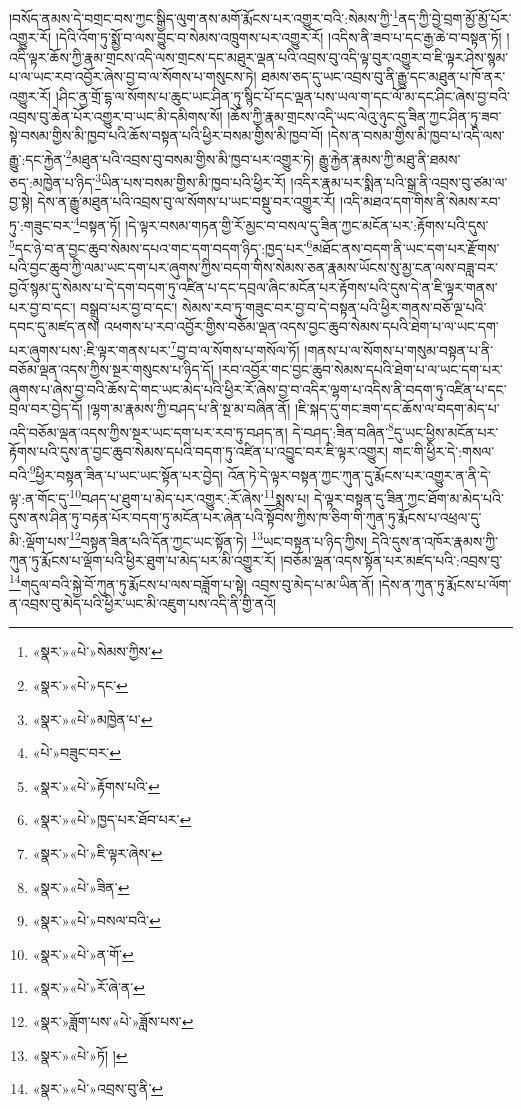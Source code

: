 །བསོད་ནམས་དེ་བགྲང་བས་ཀྱང་སྒྱིད་ལུག་ནས་མགོ་རྨོངས་པར་འགྱུར་བའི་:སེམས་ཀྱི་\footnote{«སྣར་»«པེ་»སེམས་ཀྱིས་}ནད་ཀྱི་བྱེ་བྲག་མྱོ་མྱོ་པོར་འགྱུར་རོ། །དེའི་འོག་ཏུ་སྨྱོ་བ་ལས་བྱུང་བ་སེམས་འཁྲུགས་པར་འགྱུར་རོ། །འདིས་ནི་ཟབ་པ་དང་རྒྱ་ཆེ་བ་བསྟན་ཏོ། །
འདི་ལྟར་ཆོས་ཀྱི་རྣམ་གྲངས་འདི་ལས་གྲངས་དང་མཐུར་ལྡན་པའི་འབྲས་བུ་འདི་ལྟ་བུར་འགྱུར་བ་ཇི་ལྟར་ཤེས་སྙམ་པ་ལ་ཡང་རབ་འབྱོར་ཞེས་བྱ་བ་ལ་སོགས་པ་གསུངས་ཏེ། ཐམས་ཅད་དུ་ཡང་འབྲས་བུ་ནི་རྒྱུ་དང་མཐུན་པ་ཁོ་ནར་འགྱུར་རོ། །ཤིང་ནྱ་གྲོ་དྷ་ལ་སོགས་པ་ཆུང་ཡང་ཤིན་ཏུ་སྙིང་པོ་དང་ལྡན་པས་ཡལ་ག་དང་ལོ་མ་དང་ཤིང་ཞེས་བྱ་བའི་འབྲས་བུ་ཆེན་པོར་འགྱུར་བ་ཡང་མི་དམིགས་སོ། །ཆོས་ཀྱི་རྣམ་གྲངས་འདི་ཡང་ལེའུ་ཉུང་དུ་ཟིན་ཀྱང་ཤིན་ཏུ་ཟབ་སྟེ་བསམ་གྱིས་མི་ཁྱབ་པའི་ཆོས་བསྟན་པའི་ཕྱིར་བསམ་གྱིས་མི་ཁྱབ་བོ། །དེས་ན་བསམ་གྱིས་མི་ཁྱབ་པ་འདི་ལས་རྒྱུ་:དང་རྐྱེན་\footnote{«སྣར་»«པེ་»དང་}མཐུན་པའི་འབྲས་བུ་བསམ་གྱིས་མི་ཁྱབ་པར་འགྱུར་ཏེ། རྒྱུ་རྐྱེན་རྣམས་ཀྱི་མཐུ་ནི་ཐམས་ཅད་:མཁྱེན་པ་ཉིད་\footnote{«སྣར་»«པེ་»མཁྱེན་པ་}ཡིན་པས་བསམ་གྱིས་མི་ཁྱབ་པའི་ཕྱིར་རོ། །འདིར་རྣམ་པར་སྨིན་པའི་སྒྲ་ནི་འབྲས་བུ་ཙམ་ལ་བྱ་སྟེ། དེས་ན་རྒྱུ་མཐུན་པའི་འབྲས་བུ་ལ་སོགས་པ་ཡང་བསྡུ་བར་འགྱུར་རོ། །འདི་མཐའ་དག་གིས་ནི་སེམས་རབ་ཏུ་:གཟུང་བར་\footnote{«པེ་»བཟུང་བར་}བསྟན་ཏོ། །དེ་ལྟར་བསམ་གཏན་གྱི་རོ་མྱང་བ་བསལ་དུ་ཟིན་ཀྱང་མངོན་པར་:རྟོགས་པའི་དུས་\footnote{«སྣར་»«པེ་»རྟོགས་པའི་}དང་ཉེ་བ་ན་བྱང་ཆུབ་སེམས་དཔའ་གང་དག་བདག་ཉིད་:ཁྱད་པར་\footnote{«སྣར་»«པེ་»ཁྱད་པར་ཐོབ་པར་}མཐོང་ནས་བདག་ནི་ཡང་དག་པར་རྫོགས་པའི་བྱང་ཆུབ་ཀྱི་ལམ་ཡང་དག་པར་ཞུགས་ཀྱིས་བདག་གིས་སེམས་ཅན་རྣམས་ཡོངས་སུ་མྱ་ངན་ལས་བཟླ་བར་བྱའོ་སྙམ་དུ་སེམས་པ་དེ་དག་བདག་ཏུ་འཛིན་པ་དང་དབྲལ་ཞིང་མངོན་པར་རྟོགས་པའི་དུས་དེ་ན་ཇི་ལྟར་གནས་པར་བྱ་བ་དང་། བསྒྲུབ་པར་བྱ་བ་དང་། སེམས་རབ་ཏུ་གཟུང་བར་བྱ་བ་དེ་བསྟན་པའི་ཕྱིར་གནས་བཅོ་ལྔ་པའི་དབང་དུ་མཛད་ནས། འཕགས་པ་རབ་འབྱོར་གྱིས་བཅོམ་ལྡན་འདས་བྱང་ཆུབ་སེམས་དཔའི་ཐེག་པ་ལ་ཡང་དག་པར་ཞུགས་པས་:ཇི་ལྟར་གནས་པར་\footnote{«སྣར་»«པེ་»ཇི་ལྟར་ཞེས་}བྱ་བ་ལ་སོགས་པ་གསོལ་ཏོ། །གནས་པ་ལ་སོགས་པ་གསུམ་བསྟན་པ་ནི་བཅོམ་ལྡན་འདས་ཀྱིས་སྔར་གསུངས་པ་ཉིད་དོ། །རབ་འབྱོར་གང་བྱང་ཆུབ་སེམས་དཔའི་ཐེག་པ་ལ་ཡང་དག་པར་ཞུགས་པ་ཞེས་བྱ་བའི་ཆོས་དེ་གང་ཡང་མེད་པའི་ཕྱིར་རོ་ཞེས་བྱ་བ་འདིར་ལྷག་པ་འདིས་ནི་བདག་ཏུ་འཛིན་པ་དང་བྲལ་བར་བྱེད་དོ། །ལྷག་མ་རྣམས་ཀྱི་བཤད་པ་ནི་སྔ་མ་བཞིན་ནོ། །ཇི་སྐད་དུ་གང་ཟག་དང་ཆོས་ལ་བདག་མེད་པ་འདི་བཅོམ་ལྡན་འདས་ཀྱིས་སྔར་ཡང་དག་པར་རབ་ཏུ་བཤད་ན། དེ་བཤད་:ཟིན་བཞིན་\footnote{«སྣར་»«པེ་»ཟིན་}དུ་ཡང་ཕྱིས་མངོན་པར་རྟོགས་པའི་དུས་ན་བྱང་ཆུབ་སེམས་དཔའི་བདག་ཏུ་འཛིན་པ་འབྱུང་བར་ཇི་ལྟར་འགྱུར། གང་གི་ཕྱིར་དེ་:གསལ་བའི་\footnote{«སྣར་»«པེ་»བསལ་བའི་}ཕྱིར་བསྟན་ཟིན་པ་ཡང་ཡང་སྟོན་པར་བྱེད། འོན་ཏེ་དེ་ལྟར་བསྟན་ཀྱང་ཀུན་དུ་རྨོངས་པར་འགྱུར་ན་ནི་དེ་ལྟ་:ན་གོང་དུ་\footnote{«སྣར་»«པེ་»ན་གོ་}བཤད་པ་ཐུག་པ་མེད་པར་འགྱུར་:རོ་ཞེས་\footnote{«སྣར་»«པེ་»རོ་ཞེ་ན་}སྨྲས་པ། དེ་ལྟར་བསྟན་དུ་ཟིན་ཀྱང་ཐོག་མ་མེད་པའི་དུས་ནས་ཤིན་ཏུ་བརྟན་པོར་བདག་ཏུ་མངོན་པར་ཞེན་པའི་སྟོབས་ཀྱིས་ཁ་ཅིག་གི་ཀུན་ཏུ་རྨོངས་པ་འཕྲལ་དུ་མི་:ལྡོག་པས་\footnote{«སྣར་»ཟློག་པས་«པེ་»ཟློས་པས་}བསྟན་ཟིན་པའི་དོན་ཀྱང་ཡང་སྟོན་ཏེ། \footnote{«སྣར་»«པེ་»ཏོ། ། }ཡང་བསྟན་པ་ཉིད་ཀྱིས། དེའི་དུས་ན་འཁོར་རྣམས་ཀྱི་ཀུན་ཏུ་རྨོངས་པ་ལྡོག་པའི་ཕྱིར་ཐུག་པ་མེད་པར་མི་འགྱུར་རོ། །བཅོམ་ལྡན་འདས་སྟོན་པར་མཛད་པའི་:འབྲས་བུ་\footnote{«སྣར་»«པེ་»འབྲས་བུ་ནི་}གདུལ་བའི་སྐྱེ་བོ་ཀུན་ཏུ་རྨོངས་པ་ལས་བཟློག་པ་སྟེ། འབྲས་བུ་མེད་པ་མ་ཡིན་ནོ། །དེས་ན་ཀུན་ཏུ་རྨོངས་པ་ལོག་ན་འབྲས་བུ་མེད་པའི་ཕྱིར་ཡང་མི་འཇུག་པས་འདི་ནི་གྱི་ནའོ། 